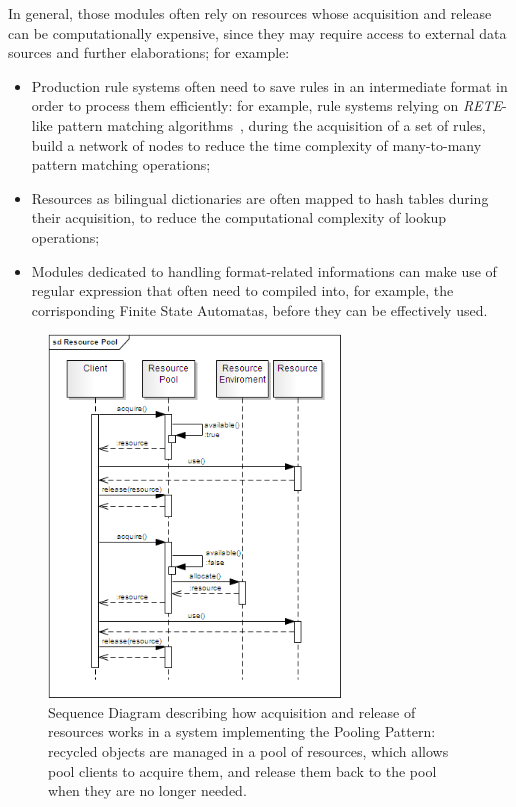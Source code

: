 \documentclass[11pt]{article}
\begin{document}
In general, those modules often rely on resources whose acquisition and release can be computationally expensive, since they may require access to external data sources and further elaborations; for example:

\begin{itemize}
 \item Production rule systems often need to save rules in an intermediate format in order to process them efficiently: for example, rule systems relying on \emph{RETE}-like pattern matching algorithms~\citep{forgy}, during the acquisition of a set of rules, build a network of nodes to reduce the time complexity of many-to-many pattern matching operations;
 \item Resources as bilingual dictionaries are often mapped to hash tables during their acquisition, to reduce the computational complexity of lookup operations;
 \item Modules dedicated to handling format-related informations can make use of regular expression that often need to compiled into, for example, the corrisponding Finite State Automatas, before they can be effectively used.
\end{itemize}

\begin{figure}[!ht]
\begin{center}
\includegraphics[width=7.75cm]{resource_pool}
\end{center}
\caption{Sequence Diagram describing how acquisition and release of resources works in a system implementing the Pooling Pattern: recycled objects are managed in a pool of resources, which allows pool clients to acquire them, and release them back to the pool when they are no longer needed.}
\label{fig:rp}
\end{figure}
\end{document}
